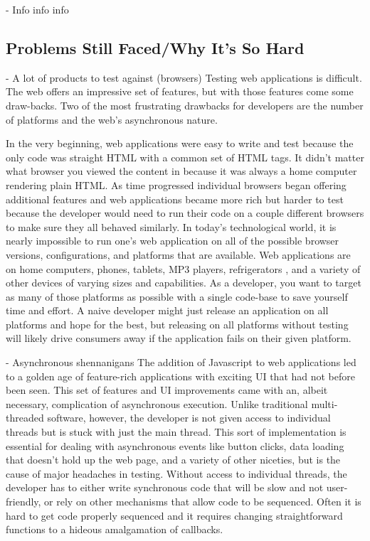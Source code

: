 \documentclass[11pt]{article}
\begin{document}
- Info info info

\subsection{Problems Still Faced/Why It's So Hard}
- A lot of products to test against (browsers)
Testing web applications is difficult. The web offers an impressive set of features, but with those features come some draw-backs. Two of the most frustrating drawbacks for developers are the number of platforms and the web's asynchronous nature.

In the very beginning, web applications were easy to write and test because the only code was straight HTML with a common set of HTML tags. It didn't matter what browser you viewed the content in because it was always a home computer rendering plain HTML. As time progressed individual browsers began offering additional features and web applications became more rich but harder to test because the developer would need to run their code on a couple different browsers to make sure they all behaved similarly. In today's technological world, it is nearly impossible to run one's web application on all of the possible browser versions, configurations, and platforms that are available. Web applications are on home computers, phones, tablets, MP3 players, refrigerators \cite{SamsungFridge}, and a variety of other devices of varying sizes and capabilities. As a developer, you want to target as many of those platforms as possible with a single code-base to save yourself time and effort. A naive developer might just release an application on all platforms and hope for the best, but releasing on all platforms without testing will likely drive consumers away if the application fails on their given platform.

- Asynchronous shennanigans
The addition of Javascript to web applications led to a golden age of feature-rich applications with exciting UI that had not before been seen. This set of features and UI improvements came with an, albeit necessary, complication of asynchronous execution. Unlike traditional multi-threaded software, however, the developer is not given access to individual threads but is stuck with just the main thread. This sort of implementation is essential for dealing with asynchronous events like button clicks, data loading that doesn't hold up the web page, and a variety of other niceties, but is the cause of major headaches in testing. Without access to individual threads, the developer has to either write synchronous code that will be slow and not user-friendly, or rely on other mechanisms that allow code to be sequenced. Often it is hard to get code properly sequenced and it requires changing straightforward functions to a hideous amalgamation of callbacks.
\end{document}
